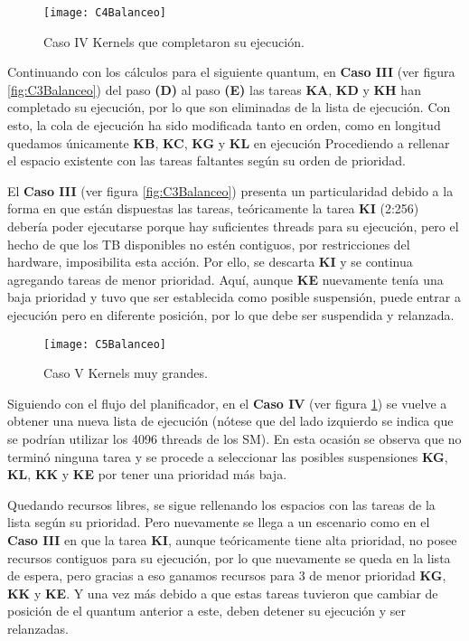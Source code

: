              \begin{figure}[!]
      \centering
        \texttt{[image: C4Balanceo]}
        \caption{Caso IV Kernels que completaron su ejecución.}
        \label{fig:C4Balanceo}
    \end{figure}
    
    Continuando con los cálculos para el siguiente quantum, en \textbf{Caso III} (ver figura \ref{fig:C3Balanceo}) del paso \textbf{(D)} al paso \textbf{(E)} las tareas \textbf{KA}, \textbf{KD} y \textbf{KH} han completado su ejecución, por lo que son eliminadas de la lista de ejecución. Con esto, la cola de ejecución ha sido modificada tanto en orden, como en longitud quedamos únicamente \textbf{KB}, \textbf{KC}, \textbf{KG} y \textbf{KL}  en ejecución Procediendo a rellenar el espacio existente con las tareas faltantes según su orden de prioridad. 
    \newline

    
    El \textbf{Caso III} (ver figura \ref{fig:C3Balanceo}) presenta un particularidad debido a la forma en que están dispuestas las tareas, teóricamente la tarea \textbf{KI} (2:256) debería poder ejecutarse porque hay suficientes threads para su ejecución, pero el hecho de que los TB disponibles no estén contiguos, por restricciones del hardware, imposibilita esta acción. 
    Por ello, se descarta \textbf{KI} y se continua agregando tareas de menor prioridad. Aquí, aunque \textbf{KE} nuevamente tenía una baja prioridad y tuvo que ser establecida como posible suspensión, puede entrar a ejecución pero en diferente posición, por lo que debe ser suspendida y relanzada.
\newline

    \begin{figure}[h]
      \centering
        \texttt{[image: C5Balanceo]}
        \caption{Caso V Kernels muy grandes.}
        \label{fig:C5Balanceo}
    \end{figure} 
    
    Siguiendo con el flujo del planificador, en el \textbf{Caso IV} (ver figura \ref{fig:C4Balanceo}) se vuelve a obtener una nueva lista de ejecución (nótese que del lado izquierdo se indica que se podrían utilizar los 4096 threads de los SM). En esta ocasión se observa que no terminó ninguna tarea y se procede a seleccionar las posibles suspensiones \textbf{KG}, \textbf{KL}, \textbf{KK} y \textbf{KE} por tener una prioridad más baja.
    
    Quedando recursos libres, se sigue rellenando los espacios con las tareas de la lista según su prioridad. Pero nuevamente se llega a un escenario como en el \textbf{Caso III} en que la tarea \textbf{KI}, aunque  teóricamente tiene alta prioridad, no posee recursos contiguos para su ejecución, por lo que nuevamente se queda en la lista de espera, pero gracias a eso ganamos recursos para 3 de menor prioridad \textbf{KG}, \textbf{KK} y \textbf{KE}. 
    Y una vez más debido a que estas tareas tuvieron que cambiar de posición de el quantum anterior a este, deben detener su ejecución y ser relanzadas.
\newline

